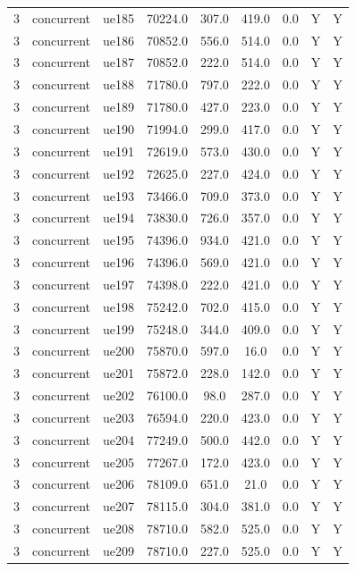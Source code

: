 \begin{table}[ht]
\begin{tabular}{|c|c|c|c|c|c|c|c|c|}
3 & concurrent & ue185 & 70224.0 & 307.0 & 419.0 & 0.0 & Y & Y \\
3 & concurrent & ue186 & 70852.0 & 556.0 & 514.0 & 0.0 & Y & Y \\
3 & concurrent & ue187 & 70852.0 & 222.0 & 514.0 & 0.0 & Y & Y \\
3 & concurrent & ue188 & 71780.0 & 797.0 & 222.0 & 0.0 & Y & Y \\
3 & concurrent & ue189 & 71780.0 & 427.0 & 223.0 & 0.0 & Y & Y \\
3 & concurrent & ue190 & 71994.0 & 299.0 & 417.0 & 0.0 & Y & Y \\
3 & concurrent & ue191 & 72619.0 & 573.0 & 430.0 & 0.0 & Y & Y \\
3 & concurrent & ue192 & 72625.0 & 227.0 & 424.0 & 0.0 & Y & Y \\
3 & concurrent & ue193 & 73466.0 & 709.0 & 373.0 & 0.0 & Y & Y \\
3 & concurrent & ue194 & 73830.0 & 726.0 & 357.0 & 0.0 & Y & Y \\
3 & concurrent & ue195 & 74396.0 & 934.0 & 421.0 & 0.0 & Y & Y \\
3 & concurrent & ue196 & 74396.0 & 569.0 & 421.0 & 0.0 & Y & Y \\
3 & concurrent & ue197 & 74398.0 & 222.0 & 421.0 & 0.0 & Y & Y \\
3 & concurrent & ue198 & 75242.0 & 702.0 & 415.0 & 0.0 & Y & Y \\
3 & concurrent & ue199 & 75248.0 & 344.0 & 409.0 & 0.0 & Y & Y \\
3 & concurrent & ue200 & 75870.0 & 597.0 & 16.0 & 0.0 & Y & Y \\
3 & concurrent & ue201 & 75872.0 & 228.0 & 142.0 & 0.0 & Y & Y \\
3 & concurrent & ue202 & 76100.0 & 98.0 & 287.0 & 0.0 & Y & Y \\
3 & concurrent & ue203 & 76594.0 & 220.0 & 423.0 & 0.0 & Y & Y \\
3 & concurrent & ue204 & 77249.0 & 500.0 & 442.0 & 0.0 & Y & Y \\
3 & concurrent & ue205 & 77267.0 & 172.0 & 423.0 & 0.0 & Y & Y \\
3 & concurrent & ue206 & 78109.0 & 651.0 & 21.0 & 0.0 & Y & Y \\
3 & concurrent & ue207 & 78115.0 & 304.0 & 381.0 & 0.0 & Y & Y \\
3 & concurrent & ue208 & 78710.0 & 582.0 & 525.0 & 0.0 & Y & Y \\
3 & concurrent & ue209 & 78710.0 & 227.0 & 525.0 & 0.0 & Y & Y \\

\end{tabular}
\end{table}
